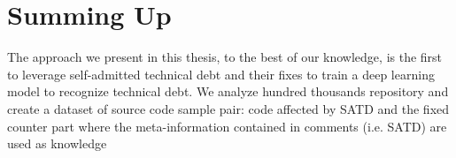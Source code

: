 \section{Summing Up}

The approach we present in this thesis, to the best of our knowledge, is the first to leverage self-admitted technical debt and their fixes to train a deep learning model to recognize technical debt. We analyze hundred thousands repository and create a dataset of source code sample pair: code affected by SATD and the fixed counter part  where the meta-information contained in comments (i.e. SATD) are used as knowledge 
